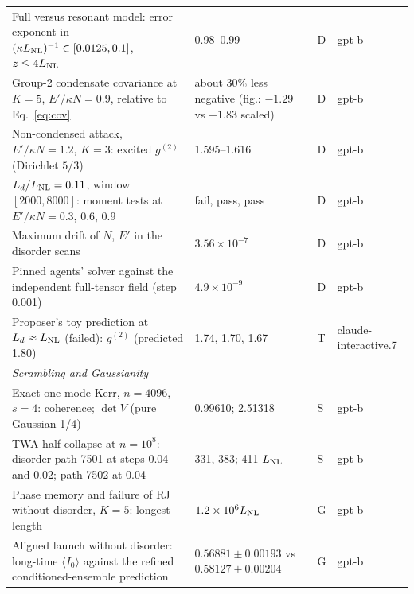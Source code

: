 \documentclass[aps,pra,twocolumn,superscriptaddress,nofootinbib,floatfix]{revtex4-2}
\newcommand{\LNL}{L_{\rm NL}}
\newcommand{\ekn}{E'/\kappa N}
\begin{document}
\begin{table}[t]
\begin{ruledtabular}
\begin{tabular}{p{9.4cm}p{4.8cm}p{0.9cm}p{1.9cm}}
\raggedright Full versus resonant model: error exponent in $(\kappa\LNL)^{-1}\in[0.0125,0.1]$, $z\le4\LNL$ & \raggedright 0.98--0.99 & \raggedright D & \raggedright gpt-b \tabularnewline
\raggedright Group-2 condensate covariance at $K=5$, $\ekn=0.9$, relative to Eq.~\eqref{eq:cov} & \raggedright about 30\% less negative (fig.: $-1.29$ vs $-1.83$ scaled) & \raggedright D & \raggedright gpt-b \tabularnewline
\raggedright Non-condensed attack, $\ekn=1.2$, $K=3$: excited $g^{(2)}$ (Dirichlet $5/3$) & \raggedright 1.595--1.616 & \raggedright D & \raggedright gpt-b \tabularnewline
\raggedright $L_d/\LNL=0.11$, window $[2000,8000]$: moment tests at $\ekn=0.3$, 0.6, 0.9 & \raggedright fail, pass, pass & \raggedright D & \raggedright gpt-b \tabularnewline
\raggedright Maximum drift of $N$, $E'$ in the disorder scans & \raggedright $3.56\times10^{-7}$ & \raggedright D & \raggedright gpt-b \tabularnewline
\raggedright Pinned agents' solver against the independent full-tensor field (step 0.001) & \raggedright $4.9\times10^{-9}$ & \raggedright D & \raggedright gpt-b \tabularnewline
\raggedright Proposer's toy prediction at $L_d\approx\LNL$ (failed): $g^{(2)}$ (predicted 1.80) & \raggedright 1.74, 1.70, 1.67 & \raggedright T & \raggedright claude-interactive.7 \tabularnewline
\multicolumn{4}{l}{\textit{Scrambling and Gaussianity}} \tabularnewline
\raggedright Exact one-mode Kerr, $n=4096$, $s=4$: coherence; $\det V$ (pure Gaussian 1/4) & \raggedright 0.99610; 2.51318 & \raggedright S & \raggedright gpt-b \tabularnewline
\raggedright TWA half-collapse at $n=10^8$: disorder path 7501 at steps 0.04 and 0.02; path 7502 at 0.04 & \raggedright 331, 383; 411 $\LNL$ & \raggedright S & \raggedright gpt-b \tabularnewline
\raggedright Phase memory and failure of RJ without disorder, $K=5$: longest length & \raggedright $1.2\times10^6\LNL$ & \raggedright G & \raggedright gpt-b \tabularnewline
\raggedright Aligned launch without disorder: long-time $\langle I_0\rangle$ against the refined conditioned-ensemble prediction & \raggedright $0.56881\pm0.00193$ vs $0.58127\pm0.00204$ & \raggedright G & \raggedright gpt-b \tabularnewline
\end{tabular}
\end{ruledtabular}
\end{table}
\end{document}
